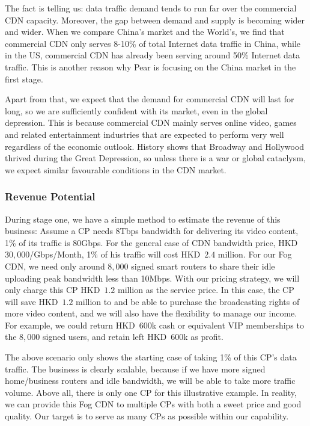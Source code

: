 The fact is telling us: data traffic demand tends to run far over the commercial CDN capacity. Moreover, the gap between demand and supply is becoming wider and wider. When we compare China's market and the World's, we find that commercial CDN only serves 8-10\% of total Internet data traffic in China, while in the US, commercial CDN has already been serving around 50\% Internet data traffic. This is another reason why Pear is focusing on the China market in the first stage.

Apart from that, we expect that the demand for commercial CDN will last for long, so we are sufficiently confident with its market, even in the global depression. This is because commercial CDN mainly serves online video, games and related entertainment industries that are expected to perform very well regardless of the economic outlook. History shows that Broadway and Hollywood thrived during the Great Depression, so unless there is a war or global cataclysm, we expect similar favourable conditions in the CDN market. 

\subsubsection{Revenue Potential}\label{revenue-potential}
During stage one, we have a simple method to estimate the revenue of this business:
Assume a CP needs 8Tbps bandwidth for delivering its video content, 1\% of its traffic is 80Gbps. For the general case of CDN bandwidth price, HKD~$30,000$/Gbps/Month, 1\% of his traffic will cost HKD~$2.4$ million. For our Fog CDN, we need only around $8,000$ signed smart routers to share their idle uploading peak bandwidth less than 10Mbps. With our pricing strategy, we will only charge this CP HKD~$1.2$ million as the service price. In this case, the CP will save HKD~$1.2$ million to and be able to purchase the broadcasting rights of more video content, and we will also have the flexibility to manage our income. For example, we could return HKD~$600$k cash or equivalent VIP memberships to the $8,000$ signed users, and retain left HKD~$600$k as profit.

The above scenario only shows the starting case of taking 1\% of this CP's data traffic. The business is clearly scalable, because if we have more signed home/business routers and idle bandwidth, we will be able to take more traffic volume. Above all, there is only one CP for this illustrative example. In reality, we can provide this Fog CDN to multiple CPs with both a sweet price and good quality. Our target is to serve as many CPs as possible within our capability. 

